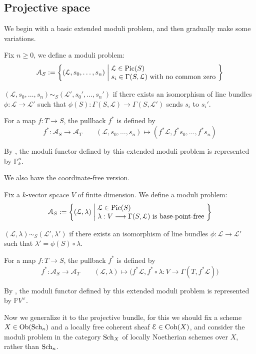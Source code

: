 \subsection{Projective space}
We begin with a basic extended moduli problem, and then gradually make some variations.
\begin{eg}
Fix $n \geqslant 0$, we define a moduli problem:
$$\mathcal{A}_S:=\left\{(\mathcal{L},s_0,\ldots,s_n)  \;\middle|\; \begin{aligned}
&\\[-5mm]
&\mathcal{L} \in \operatorname{Pic}(S)\\[-1mm]
& s_i \in \Gamma(S,\mathcal{L}) \text{ with no common zero }
\end{aligned}
 \right\}$$
 
  $(\mathcal{L},s_0,\ldots,s_n) \sim_S (\mathcal{L}',s_0',\ldots,s_n')$ if there exists an isomorphism of line bundles $\phi:\mathcal{L} \longrightarrow \mathcal{L}'$ such that $\phi(S):\Gamma(S,\mathcal{L}) \longrightarrow \Gamma(S,\mathcal{L}')$ sends $s_i$ to $s_i'$.
  
  For a map $f:T \longrightarrow S$, the pullback $f^*$ is defined by
     $$f^*:\mathcal{A}_S \longrightarrow \mathcal{A}_T \qquad (\mathcal{L},s_0,\ldots,s_n) \longmapsto (f^*\mathcal{L},f^*s_0,\ldots,f^*s_n)$$
     
By \cite[15.3.F, 16.4.1]{FOAG}, the moduli functor defined by this extended moduli problem is represented by $\mathbb{P}_k^n$.
\end{eg}
We also have the coordinate-free version.
\begin{eg}[{Coordinate-free projective space $\mathbb{P}V^{\vee}=\Proj(\Sym^{\bullet} V)$, see \cite[4.5.12]{FOAG}}]
Fix a $k$-vector spcace $V$ of finite dimension. We define a moduli problem:
$$\mathcal{A}_S:=\left\{(\mathcal{L},\lambda)  \;\middle|\; \begin{aligned}
&\\[-5mm]
&\mathcal{L} \in \operatorname{Pic}(S)\\[-1mm]
& \lambda:V \longrightarrow \Gamma(S,\mathcal{L}) \text{ is base-point-free }
\end{aligned}
 \right\}$$
 
   $(\mathcal{L},\lambda) \sim_S (\mathcal{L}',\lambda')$ if there exists an isomorphism of line bundles $\phi:\mathcal{L} \longrightarrow \mathcal{L}'$ such that $\lambda'=\phi(S) \circ \lambda$.
   
   For a map $f:T \longrightarrow S$, the pullback $f^*$ is defined by
      $$f^*:\mathcal{A}_S \longrightarrow \mathcal{A}_T \qquad (\mathcal{L},\lambda) \longmapsto \big(f^*\mathcal{L},f^*\circ \lambda:V \rightarrow \Gamma(T,f^*\mathcal{L})\big)$$
      
      By \cite[16.4.E]{FOAG}, the moduli functor defined by this extended moduli problem is represented by $\mathbb{P}V^{\vee}$.
\end{eg}
Now we generalize it to the projective bundle, for this we should fix a scheme $X \in \operatorname{Ob}(\operatorname{Sch}_{\kappa})$ and a locally free coherent sheaf $\mathcal{E} \in \operatorname{Coh}(X)$, and consider the moduli problem in the category $\operatorname{Sch}_{X}$ of locally Noetherian schemes over $X$, rather than $\operatorname{Sch}_{\kappa}$.

